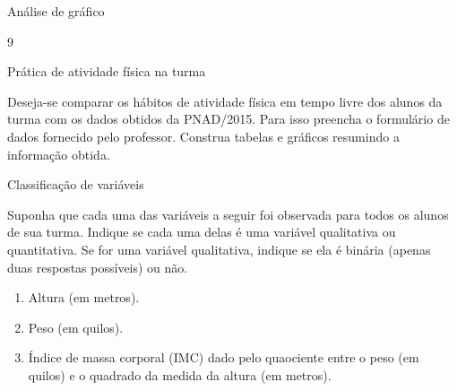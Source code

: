 {\begin{answer}{Análise de gráfico}
{\begin{enumerate}
\begin{figure}[H]
\end{figure}
\end{enumerate}
}{9}
\end{answer}


\label{est1-prac-1}


\label{est1-ativ-5}
\begin{task}{ Prática de atividade física na turma}

Deseja-se comparar os hábitos de atividade física em tempo livre dos alunos da turma com os dados obtidos da PNAD/2015. Para isso preencha o formulário de dados fornecido pelo professor. Construa tabelas e gráficos resumindo a informação obtida.
\end{task}
\label{est1-ativ-6}
\begin{task}{ Classificação de variáveis}

Suponha que cada uma das variáveis a seguir foi observada para todos os alunos de sua turma. Indique se cada uma delas é uma variável qualitativa ou quantitativa. Se for uma variável qualitativa, indique se ela é binária (apenas duas respostas possíveis) ou não.
\begin{enumerate}
\item {} 
Altura (em metros).

\item {} 
Peso (em quilos).

\item {} 
Índice de massa corporal (IMC) dado pelo quaociente entre o peso (em quilos) e o quadrado da medida da altura (em metros).


\end{enumerate}
\end{task}}
